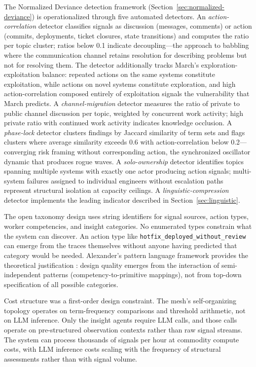 \documentclass[11pt,a4paper]{article}
\begin{document}
The Normalized Deviance detection framework (Section~\ref{sec:normalized-deviance}) is operationalized through five automated detectors. An \emph{action-correlation} detector classifies signals as discussion (messages, comments) or action (commits, deployments, ticket closures, state transitions) and computes the ratio per topic cluster; ratios below 0.1 indicate decoupling---the approach to babbling where the communication channel retains resolution for describing problems but not for resolving them. The detector additionally tracks March's \citeyear{march1991} exploration-exploitation balance: repeated actions on the same systems constitute exploitation, while actions on novel systems constitute exploration, and high action-correlation composed entirely of exploitation signals the vulnerability that March predicts. A \emph{channel-migration} detector measures the ratio of private to public channel discussion per topic, weighted by concurrent work activity; high private ratio with continued work activity indicates knowledge occlusion. A \emph{phase-lock} detector clusters findings by Jaccard similarity of term sets and flags clusters where average similarity exceeds 0.6 with action-correlation below 0.2---converging risk framing without corresponding action, the synchronized oscillator dynamic that produces rogue waves. A \emph{solo-ownership} detector identifies topics spanning multiple systems with exactly one actor producing action signals; multi-system failures assigned to individual engineers without escalation paths represent structural isolation at capacity ceilings. A \emph{linguistic-compression} detector implements the leading indicator described in Section~\ref{sec:linguistic}.

The open taxonomy design uses string identifiers for signal sources, action types, worker competencies, and insight categories. No enumerated types constrain what the system can discover. An action type like \texttt{hotfix\_deployed\_without\_review} can emerge from the traces themselves without anyone having predicted that category would be needed. Alexander's pattern language framework provides the theoretical justification \citep{alexander1977}: design quality emerges from the interaction of semi-independent patterns (competency-to-primitive mappings), not from top-down specification of all possible categories.

Cost structure was a first-order design constraint. The mesh's self-organizing topology operates on term-frequency comparisons and threshold arithmetic, not on LLM inference. Only the insight agents require LLM calls, and those calls operate on pre-structured observation contexts rather than raw signal streams. The system can process thousands of signals per hour at commodity compute costs, with LLM inference costs scaling with the frequency of structural assessments rather than with signal volume.
\end{document}
